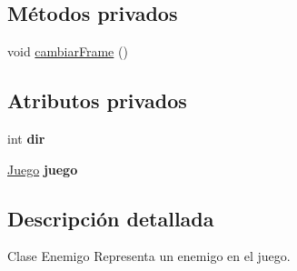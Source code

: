 \subsection*{Métodos privados}
\begin{DoxyCompactItemize}
\item 
void \hyperlink{classBatallaEspacial_1_1Enemy_a3cc0d185386b1df605e51a4036f15784}{cambiarFrame} ()
\end{DoxyCompactItemize}
\subsection*{Atributos privados}
\begin{DoxyCompactItemize}
\item 
\hypertarget{classBatallaEspacial_1_1Enemy_aa6eddfdc0195eb40c34b6150c6127579}{
int {\bfseries dir}}
\label{classBatallaEspacial_1_1Enemy_aa6eddfdc0195eb40c34b6150c6127579}

\item 
\hypertarget{classBatallaEspacial_1_1Enemy_a19945523c0577250c685d6cbed81e2bc}{
\hyperlink{classBatallaEspacial_1_1Juego}{Juego} {\bfseries juego}}
\label{classBatallaEspacial_1_1Enemy_a19945523c0577250c685d6cbed81e2bc}

\end{DoxyCompactItemize}


\subsection{Descripción detallada}
Clase Enemigo Representa un enemigo en el juego. 

